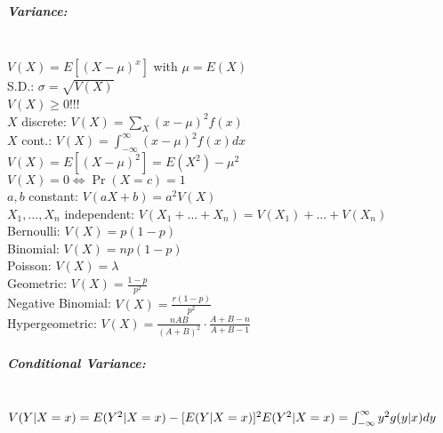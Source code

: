 \documentclass[landscape,10pt]{article}
\begin{document}
\begin{multicols}{4}
\subparagraph*{Variance: } \ \ \\
\(V(X) = E[(X-\mu)^x]\) with \(\mu = E(X)\) \\
S.D.: \(\sigma = \sqrt{V(X)}\) \\ 
\(V(X) \geq 0\)!!! \\ 
\(X\) discrete: \(V(X) = \sum\limits_X{(x-\mu)^2f(x)}\) \\ 
\(X\) cont.: \(V(X) = \int_{-\infty}^{\infty}{(x-\mu)^2f(x)dx}\) \\ 
\(V(X) = E[(X-\mu)^2] = E(X^2) - \mu^2\) \\ 
\(V(X) = 0 \iff \Pr(X = c) = 1\) \\
\(a, b\) constant: \(V(aX+b) = a^2V(X)\) \\ 
\(X_1,\ldots,X_n\) independent: \(V(X_1+\ldots+X_n) = V(X_1)+ \ldots + V(X_n)\) \\
Bernoulli: \(V(X) = p(1-p)\) \\ 
Binomial: \(V(X) = np(1-p)\) \\
Poisson: \(V(X) = \lambda\) \\
Geometric: \(V(X) = \frac{1-p}{p^2}\) \\
Negative Binomial: \(V(X) = \frac{r(1-p)}{p^2}\) \\
Hypergeometric: \(V(X) = \frac{nAB}{(A+B)^2} \cdot \frac{A+B-n}{A+B-1}\)

\subparagraph*{Conditional Variance: } \ \ \\
    \(V(Y|X=x) = E(Y^2|X=x) - [E(Y|X=x)]^2\\
    E(Y^2|X=x) = \int_{-\infty}^{\infty}{y^2 g(y|x) dy}\)


\end{multicols}
\end{document}
